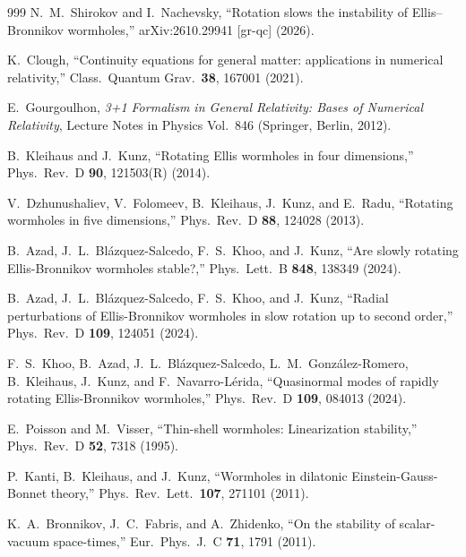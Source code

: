 \documentclass[twocolumn,floatfix,aps,prd,superscriptaddress,nofootinbib]{revtex4-2}
\begin{document}
\begin{thebibliography}{999}
N.~M.~Shirokov and I.~Nachevsky,
\newblock ``Rotation slows the instability of Ellis--Bronnikov wormholes,''
\newblock arXiv:2610.29941 [gr-qc] (2026).

K.~Clough,
\newblock ``Continuity equations for general matter: applications in numerical relativity,''
\newblock Class.\ Quantum Grav.\ \textbf{38}, 167001 (2021).

E.~Gourgoulhon,
\newblock \emph{3+1 Formalism in General Relativity: Bases of Numerical Relativity}, Lecture Notes in Physics Vol.~846
\newblock (Springer, Berlin, 2012).

B.~Kleihaus and J.~Kunz,
\newblock ``Rotating Ellis wormholes in four dimensions,''
\newblock Phys.\ Rev.\ D \textbf{90}, 121503(R) (2014).

V.~Dzhunushaliev, V.~Folomeev, B.~Kleihaus, J.~Kunz, and E.~Radu,
\newblock ``Rotating wormholes in five dimensions,''
\newblock Phys.\ Rev.\ D \textbf{88}, 124028 (2013).

B.~Azad, J.~L.~Bl\'azquez-Salcedo, F.~S.~Khoo, and J.~Kunz,
\newblock ``Are slowly rotating Ellis-Bronnikov wormholes stable?,''
\newblock Phys.\ Lett.\ B \textbf{848}, 138349 (2024).

B.~Azad, J.~L.~Bl\'azquez-Salcedo, F.~S.~Khoo, and J.~Kunz,
\newblock ``Radial perturbations of Ellis-Bronnikov wormholes in slow rotation up to second order,''
\newblock Phys.\ Rev.\ D \textbf{109}, 124051 (2024).

F.~S.~Khoo, B.~Azad, J.~L.~Bl\'azquez-Salcedo, L.~M.~Gonz\'alez-Romero, B.~Kleihaus, J.~Kunz, and F.~Navarro-L\'erida,
\newblock ``Quasinormal modes of rapidly rotating Ellis-Bronnikov wormholes,''
\newblock Phys.\ Rev.\ D \textbf{109}, 084013 (2024).

E.~Poisson and M.~Visser,
\newblock ``Thin-shell wormholes: Linearization stability,''
\newblock Phys.\ Rev.\ D \textbf{52}, 7318 (1995).

P.~Kanti, B.~Kleihaus, and J.~Kunz,
\newblock ``Wormholes in dilatonic Einstein-Gauss-Bonnet theory,''
\newblock Phys.\ Rev.\ Lett.\ \textbf{107}, 271101 (2011).

K.~A.~Bronnikov, J.~C.~Fabris, and A.~Zhidenko,
\newblock ``On the stability of scalar-vacuum space-times,''
\newblock Eur.\ Phys.\ J.\ C \textbf{71}, 1791 (2011).



\end{thebibliography}
\end{document}
